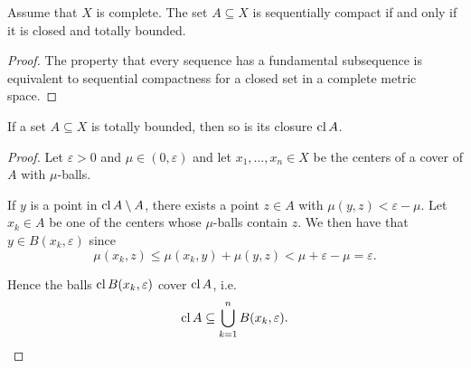 \begin{corollary}\label{thm:metric_space_compact_iff_closed_totally_bounded}
  Assume that \( X \) is complete. The set \( A \subseteq X \) is sequentially compact if and only if it is closed and totally bounded.
\end{corollary}
\begin{proof}
  The property that every sequence has a fundamental subsequence is equivalent to sequential compactness for a closed set in a complete metric space.
\end{proof}

\begin{proposition}\label{thm:closure_of_totally_bounded_is_totally_bounded}
  If a set \( A \subseteq X \) is totally bounded, then so is its closure \( \operatorname{cl} A \).
\end{proposition}
\begin{proof}
  Let \( \varepsilon > 0 \) and \( \mu \in (0, \varepsilon) \) and let \( x_1, \ldots, x_n \in X \) be the centers of a cover of \( A \) with \( \mu \)-balls.

  If \( y \) is a point in \( \operatorname{cl} A \setminus A \), there exists a point \( z \in A \) with \( \mu(y, z) < \varepsilon - \mu \). Let \( x_k \in A \) be one of the centers whose \( \mu \)-balls contain \( z \). We then have that \( y \in B(x_k, \varepsilon) \) since
  \begin{equation*}
    \mu(x_k, z) \leq \mu(x_k, y) + \mu(y, z) < \mu + \varepsilon - \mu = \varepsilon.
  \end{equation*}

  Hence the balls \( \operatorname{cl} B(x_k, \varepsilon) \) cover \( \operatorname{cl} A \), i.e.
  \begin{equation*}
    \operatorname{cl} A \subseteq \bigcup_{k=1}^n B(x_k, \varepsilon).
  \end{equation*}
\end{proof}

